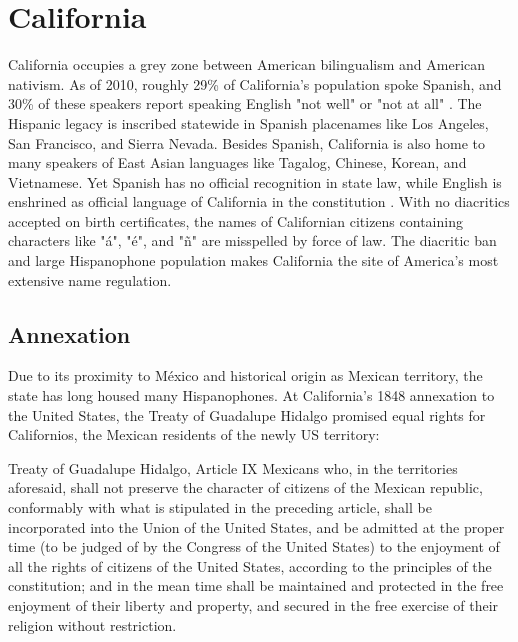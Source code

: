 \section{California}

California occupies a grey zone between American bilingualism and American
nativism. As of 2010, roughly 29\% of California's population spoke Spanish, and
30\% of these speakers report speaking English "not well" or "not at all"
\parencite{acs-lang-states}. The Hispanic legacy is inscribed statewide in
Spanish placenames like Los Angeles, San Francisco, and Sierra Nevada. Besides
Spanish, California is also home to many speakers of East Asian languages like
Tagalog, Chinese, Korean, and Vietnamese. Yet Spanish has no official
recognition in state law, while English is enshrined as official language of
California in the constitution \parencite{ca-const}. With no diacritics accepted
on birth certificates, the names of Californian citizens containing characters
like "á", "é", and "ñ" are misspelled by force of law. The diacritic ban and
large Hispanophone population makes California the site of America's most
extensive name regulation.

\subsection{Annexation}

Due to its proximity to México and historical origin as Mexican territory, the
state has long housed many Hispanophones. At California's 1848 annexation to the
United States, the Treaty of Guadalupe
Hidalgo promised equal rights for Californios, the Mexican residents of the
newly US territory: 

\begin{aquote}{Treaty of Guadalupe Hidalgo, Article IX}
	Mexicans who, in the territories aforesaid, shall not preserve the character
	of citizens of the Mexican republic, conformably with what is stipulated in
	the preceding article, shall be incorporated into the Union of the United
	States, and be admitted at the proper time (to be judged of by the Congress of
	the United States) to the enjoyment of all the rights of citizens of the
	United States, according to the principles of the constitution; and in the
	mean time shall be maintained and protected in the free enjoyment of their
	liberty and property, and secured in the free exercise of their religion
	without restriction. \parencite{guadalupe}
\end{aquote}

